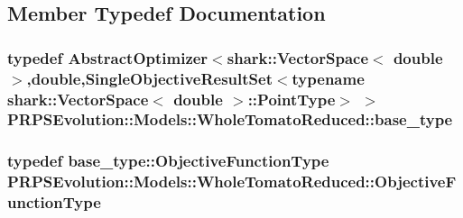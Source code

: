 \subsection{\-Member \-Typedef \-Documentation}
\hypertarget{struct_p_r_p_s_evolution_1_1_models_1_1_whole_tomato_reduced_ac9bb500c21650189965b0ee3a4be7711}{
\subsubsection[{base\-\_\-type}]{\setlength{\rightskip}{0pt plus 5cm}typedef \-Abstract\-Optimizer$<$shark\-::\-Vector\-Space$<$ double $>$,double,\-Single\-Objective\-Result\-Set$<$typename shark\-::\-Vector\-Space$<$ double $>$\-::\-Point\-Type$>$ $>$ {\bf \-P\-R\-P\-S\-Evolution\-::\-Models\-::\-Whole\-Tomato\-Reduced\-::base\-\_\-type}}}\label{struct_p_r_p_s_evolution_1_1_models_1_1_whole_tomato_reduced_ac9bb500c21650189965b0ee3a4be7711}
\hypertarget{struct_p_r_p_s_evolution_1_1_models_1_1_whole_tomato_reduced_a3c630a87315f434a332b6a753576ce78}{
\subsubsection[{\-Objective\-Function\-Type}]{\setlength{\rightskip}{0pt plus 5cm}typedef base\-\_\-type\-::\-Objective\-Function\-Type {\bf \-P\-R\-P\-S\-Evolution\-::\-Models\-::\-Whole\-Tomato\-Reduced\-::\-Objective\-Function\-Type}}}\label{struct_p_r_p_s_evolution_1_1_models_1_1_whole_tomato_reduced_a3c630a87315f434a332b6a753576ce78}


